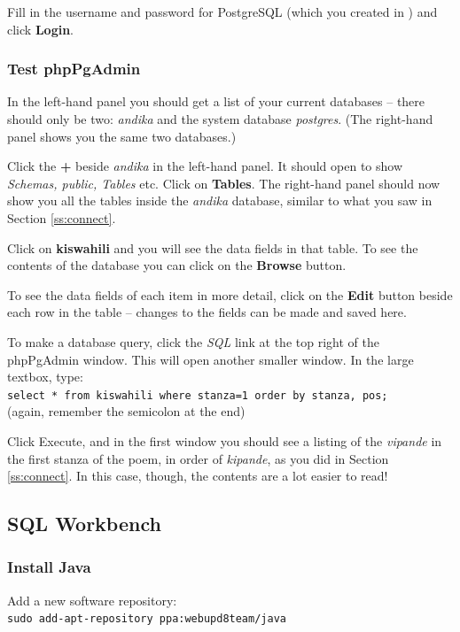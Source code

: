 \documentclass[a4paper,10pt, oneside]{book}
\begin{document}
Fill in the username and password for PostgreSQL (which you created in ) and click \textbf{Login}.

\subsubsection{Test phpPgAdmin}
\label{ss:testppa}

In the left-hand panel you should get a list of your current databases -- there should only be two: \textit{andika} and the system database \textit{postgres}. (The right-hand panel shows you the same two databases.)

Click the \textbf{+} beside \textit{andika} in the left-hand panel.  It should open to show \textit{Schemas, public, Tables} etc. Click on \textbf{Tables}. The right-hand panel should now show you all the tables inside the \textit{andika} database, similar to what you saw in Section \ref{ss:connect}.

Click on \textbf{kiswahili} and you will see the data fields in that table. To see the contents of the database you can click on the \textbf{Browse} button.

To see the data fields of each item in more detail, click on the \textbf{Edit} button beside each row in the table -- changes to the fields can be made and saved here.

To make a database query, click the \textit{SQL} link at the top right of the phpPgAdmin window.  This will open another smaller window.  In the large textbox, type:\\
\verb|select * from kiswahili where stanza=1 order by stanza, pos;|\\
(again, remember the semicolon at the end)

Click Execute, and in the first window you should see a listing of the \textit{vipande} in the first stanza of the poem, in order of \textit{kipande}, as you did in Section \ref{ss:connect}.  In this case, though, the contents are a lot easier to read!


\subsection{SQL Workbench}

\subsubsection{Install Java}

Add a new software repository:\\
\verb|sudo add-apt-repository ppa:webupd8team/java|
\end{document}
